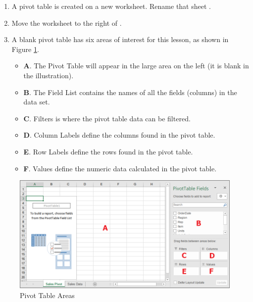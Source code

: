 \begin{enumerate}[resume]
	\item A pivot table is created on a new worksheet. Rename that sheet .
	\item Move the  worksheet to the right of .
	\item A blank pivot table has six areas of interest for this lesson, as shown in Figure \ref{07:fig13}.

	\begin{itemize}
		\item \textbf{A}. The Pivot Table will appear in the large area on the left (it is blank in the illustration).
		\item \textbf{B}. The Field List contains the names of all the fields (columns) in the data set.
		\item \textbf{C}. Filters is where the pivot table data can be filtered.
		\item \textbf{D}. Column Labels define the columns found in the pivot table.
		\item \textbf{E}. Row Labels define the rows found in the pivot table.
		\item \textbf{F}. Values define the numeric data calculated in the pivot table.
	\end{itemize}
\end{enumerate}

\begin{figure}[H]
	\centering
	\includegraphics[width=\maxwidth{.95\linewidth}]{gfx/ch07_fig13}
	\caption{Pivot Table Areas}
	\label{07:fig13}
\end{figure}

